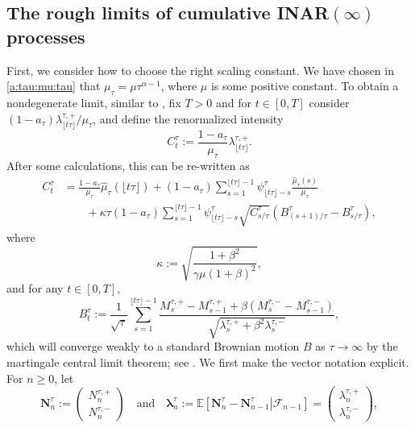 \documentclass[letterpaper]{article}
\numberwithin{equation}{section}
\theoremstyle{definition}
\theoremstyle{remark}
\begin{document}
\subsection{The rough limits of cumulative INAR\texorpdfstring{$(\infty)$}{(infty)} processes}
First, we consider how to choose the right scaling constant. We have chosen
in \eqref{a:tau:mu:tau} that
$\mu_{\tau}=\mu \tau^{\alpha-1}$,
where $\mu$ is some positive constant. To obtain a nondegenerate limit, similar to \cite{wang2026scaling}, fix $T>0$ and for $t\in[0,T]$ consider $(1-a_{\tau})\lambda_{\lfloor t\tau\rfloor}^{\tau,+}/\mu_{\tau}$, and define the renormalized intensity
\[
  C_t^{\tau}:=\frac{1-a_{\tau}}{\mu_{\tau}}\lambda_{\lfloor t\tau\rfloor}^{\tau,+}.
\]
After some calculations, this can be re-written as
\begin{equation}\label{eq:Ctau}
\begin{aligned}
  C_t^{\tau}
  &=\frac{1-a_{\tau}}{\mu_{\tau}}\hat\mu_{\tau}(\lfloor t\tau \rfloor)
   +(1-a_{\tau})\sum_{s=1}^{\lfloor t\tau \rfloor-1}\psi_{\lfloor t\tau \rfloor-s}^{\tau}\frac{\hat\mu_{\tau}(s)}{\mu_{\tau}}
   \nonumber
   \\
   &\qquad+ \kappa \tau(1-a_{\tau}) \sum_{s=1}^{\lfloor t\tau \rfloor-1}\psi_{\lfloor t\tau \rfloor-s}^{\tau}\sqrt{C_{s/\tau}^{\tau}}
  \left( B_{(s+1)/\tau}^{\tau}-B_{s/\tau}^{\tau} \right),
\end{aligned}
\end{equation}
where 
\begin{equation}
    \kappa:=\sqrt{\frac{1+\beta^2}{\gamma\mu(1+\beta)^2}},
\end{equation}
and for any $t\in[0,T]$,
\begin{equation}\label{eq:inar-mart}
B_t^{\tau}:=\frac1{\sqrt{\tau}}\sum_{s=1}^{\lfloor t\tau \rfloor-1}\frac{M_s^{\tau,+}-M_{s-1}^{\tau,+}+\beta(M_s^{\tau,-}-M_{s-1}^{\tau,-})}{\sqrt{\lambda_s^{\tau,+}+\beta^2\lambda_s^{\tau,-}}},
\end{equation}
which will converge weakly to a standard Brownian motion $B$ as $\tau\rightarrow\infty$ by the martingale central limit theorem; see \cite{wang2026scaling}. 
We first make the vector notation explicit. 
For $n\ge 0$, let 
\[
\mathbf N_n^{\tau}:=\begin{pmatrix}N_n^{\tau,+}\\ N_n^{\tau,-}\end{pmatrix}
\quad\text{and}\quad
\boldsymbol\lambda_n^{\tau}:=\mathbb E\left[\left.\mathbf N_n^{\tau}-\mathbf N_{n-1}^{\tau}\right|\mathcal F_{n-1}\right]
=\begin{pmatrix}\lambda_n^{\tau,+}\\ \lambda_n^{\tau,-}\end{pmatrix},
\]
\end{document}
